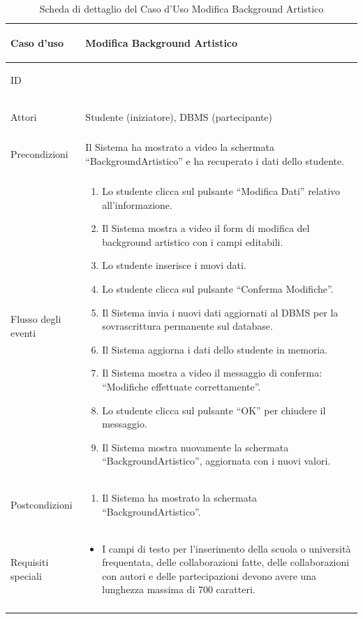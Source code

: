 \documentclass[12pt,a4paper]{article}
\begin{document}
\footnotesize
\begin{longtable}{|
>{\columncolor{unipablue}\color{white}\bfseries\raggedright\arraybackslash}p{3.4cm}|
>{\raggedright\arraybackslash}p{11.1cm}|}
\hline
Caso d’uso & Modifica Background Artistico \\ \hline
ID & 2.2 \\ \hline
Attori & Studente (iniziatore), DBMS (partecipante) \\ \hline
Precondizioni & Il Sistema ha mostrato a video la schermata ``BackgroundArtistico'' e ha recuperato i dati dello studente. \\ \hline
Flusso degli eventi &
\begin{enumerate}[topsep=0.15em,itemsep=0.1em,parsep=0pt,partopsep=0pt]
    \item Lo studente clicca sul pulsante ``Modifica Dati'' relativo all'informazione.
    \item Il Sistema mostra a video il form di modifica del background artistico con i campi editabili.
    \item Lo studente inserisce i nuovi dati.
    \item Lo studente clicca sul pulsante ``Conferma Modifiche''.
    \item Il Sistema invia i nuovi dati aggiornati al DBMS per la sovrascrittura permanente sul database.
    \item Il Sistema aggiorna i dati dello studente in memoria.
    \item Il Sistema mostra a video il messaggio di conferma: ``Modifiche effettuate correttamente''.
    \item Lo studente clicca sul pulsante ``OK'' per chiudere il messaggio.
    \item Il Sistema mostra nuovamente la schermata ``BackgroundArtistico'', aggiornata con i nuovi valori.
\end{enumerate} \\ \hline
Postcondizioni &
\begin{enumerate}[topsep=0.15em,itemsep=0.1em,parsep=0pt,partopsep=0pt]
    \item Il Sistema ha mostrato la schermata ``BackgroundArtistico''.
\end{enumerate} \\ \hline
Requisiti speciali &
\begin{itemize}[topsep=0.15em,itemsep=0.1em,parsep=0pt,partopsep=0pt]
    \item I campi di testo per l'inserimento della scuola o università frequentata, delle collaborazioni fatte, delle collaborazioni con autori e delle partecipazioni devono avere una lunghezza massima di 700 caratteri.
\end{itemize} \\ \hline
\caption{Scheda di dettaglio del Caso d'Uso Modifica Background Artistico}
\label{tab:uc_modifica_background_artistico}\\
\end{longtable}
\normalsize
\end{document}
